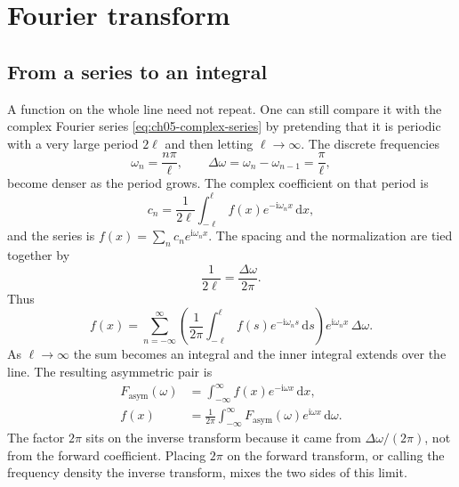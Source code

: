 \section{Fourier transform}

\subsection{From a series to an integral}

A function on the whole line need not repeat. One can still compare it with the complex Fourier series \eqref{eq:ch05-complex-series} by pretending that it is periodic with a very large period $2\ell$ and then letting $\ell\to\infty$. The discrete frequencies
\begin{equation}
\omega_n=\frac{n\pi}{\ell},
\qquad
\Delta\omega=\omega_n-\omega_{n-1}=\frac{\pi}{\ell},
\end{equation}
become denser as the period grows. The complex coefficient on that period is
\begin{equation}
c_n=\frac{1}{2\ell}\int_{-\ell}^{\ell}f(x)e^{-\mathrm{i}\omega_n x}\,\mathrm{d}x,
\end{equation}
and the series is $f(x)=\sum_n c_n e^{\mathrm{i}\omega_n x}$. The spacing and the normalization are tied together by
\begin{equation}
\frac{1}{2\ell}=\frac{\Delta\omega}{2\pi}.
\end{equation}
Thus
\begin{equation}
f(x)=\sum_{n=-\infty}^{\infty}
\left(\frac{1}{2\pi}\int_{-\ell}^{\ell}f(s)e^{-\mathrm{i}\omega_n s}\,\mathrm{d}s\right)
e^{\mathrm{i}\omega_n x}\,\Delta\omega.
\end{equation}
As $\ell\to\infty$ the sum becomes an integral and the inner integral extends over the line. The resulting asymmetric pair is
\begin{align}
F_{\mathrm{asym}}(\omega)
&=\int_{-\infty}^{\infty}f(x)e^{-\mathrm{i}\omega x}\,\mathrm{d}x,\\
f(x)
&=\frac{1}{2\pi}\int_{-\infty}^{\infty}F_{\mathrm{asym}}(\omega)e^{\mathrm{i}\omega x}\,\mathrm{d}\omega.
\end{align}
The factor $2\pi$ sits on the inverse transform because it came from $\Delta\omega/(2\pi)$, not from the forward coefficient. Placing $2\pi$ on the forward transform, or calling the frequency density the inverse transform, mixes the two sides of this limit.

